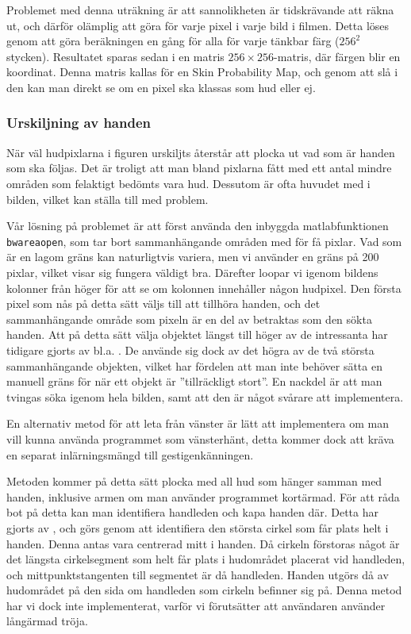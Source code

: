 \documentclass[../rapport_MVEX01-11-05]{subfiles}
\begin{document}
Problemet med denna uträkning är att sannolikheten är tidskrävande att
räkna ut, och därför olämplig att göra för varje pixel i varje bild i
filmen. Detta löses genom att göra beräkningen en gång för alla för
varje tänkbar färg ($256^2$ stycken). Resultatet sparas sedan i en
matris $256\times256$-matris, där färgen blir en koordinat. Denna matris
kallas för en Skin Probability Map, och genom att slå i den kan man
direkt se om en pixel ska klassas som hud eller ej.

\subsubsection{Urskiljning av handen}
När väl hudpixlarna i figuren urskiljts återstår att plocka ut
vad som är handen som ska följas. Det är troligt att man bland
pixlarna fått med ett antal mindre områden som felaktigt bedömts vara
hud. Dessutom är ofta huvudet med i bilden, vilket kan ställa till med
problem. 

Vår lösning på problemet är att först använda den inbyggda
matlabfunktionen \texttt{bwareaopen}, som tar bort sammanhängande 
områden med för få pixlar. Vad som är en lagom gräns kan naturligtvis
variera, men vi använder en gräns på 200 pixlar, vilket visar sig
fungera väldigt bra. Därefter loopar vi igenom bildens kolonner från
höger för att se om kolonnen innehåller någon hudpixel. Den första
pixel som nås på detta sätt väljs till att tillhöra handen, och det
sammanhängande område som pixeln är en del av betraktas som den sökta
handen. Att på detta sätt välja objektet längst till höger av de
intressanta har tidigare gjorts av bl.a. . De använde
sig dock av det högra av de två största sammanhängande objekten,
vilket har fördelen att man inte behöver sätta en manuell gräns för
när ett objekt är ''tillräckligt stort''. En nackdel är att man tvingas
söka igenom hela bilden, samt att den är något svårare att
implementera.

En alternativ metod för att leta från
vänster är lätt att implementera om man vill kunna använda programmet
som vänsterhänt, detta kommer dock att kräva en
separat inlärningsmängd till gestigenkänningen.

Metoden kommer på detta sätt plocka med all hud som hänger samman med
handen, inklusive armen om man använder programmet kortärmad. För att
råda bot på detta kan man identifiera handleden och kapa handen
där. Detta har gjorts av , och
görs genom att identifiera den största cirkel
som får plats helt i handen. Denna antas vara centrerad mitt i handen. Då
cirkeln förstoras något är det längsta cirkelsegment som helt får
plats i hudområdet placerat vid handleden, och mittpunktstangenten
till segmentet är då handleden. Handen utgörs då av hudområdet på den
sida om handleden som cirkeln befinner sig på. Denna metod har vi dock
inte implementerat, varför vi förutsätter att användaren använder
långärmad tröja. 
\end{document}
